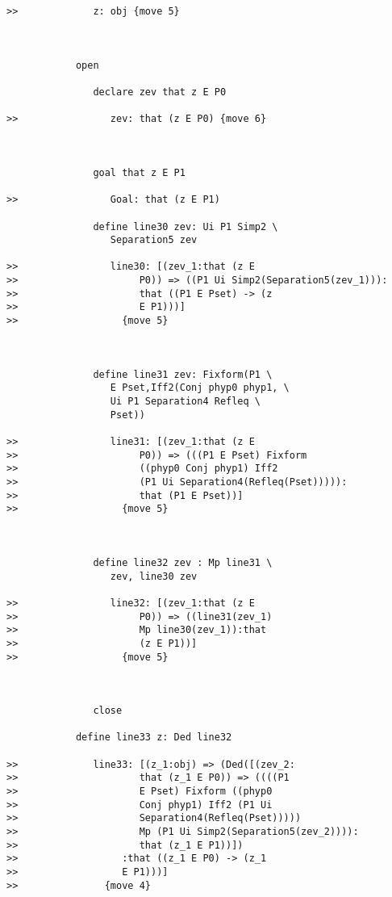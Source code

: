 \documentclass[12pt]{article}
\begin{document}
\begin{verbatim}
>>             z: obj {move 5}



            open

               declare zev that z E P0

>>                zev: that (z E P0) {move 6}



               goal that z E P1

>>                Goal: that (z E P1)

               define line30 zev: Ui P1 Simp2 \
                  Separation5 zev

>>                line30: [(zev_1:that (z E
>>                     P0)) => ((P1 Ui Simp2(Separation5(zev_1))):
>>                     that ((P1 E Pset) -> (z
>>                     E P1)))]
>>                  {move 5}



               define line31 zev: Fixform(P1 \
                  E Pset,Iff2(Conj phyp0 phyp1, \
                  Ui P1 Separation4 Refleq \
                  Pset))

>>                line31: [(zev_1:that (z E
>>                     P0)) => (((P1 E Pset) Fixform
>>                     ((phyp0 Conj phyp1) Iff2
>>                     (P1 Ui Separation4(Refleq(Pset))))):
>>                     that (P1 E Pset))]
>>                  {move 5}



               define line32 zev : Mp line31 \
                  zev, line30 zev

>>                line32: [(zev_1:that (z E
>>                     P0)) => ((line31(zev_1)
>>                     Mp line30(zev_1)):that
>>                     (z E P1))]
>>                  {move 5}



               close

            define line33 z: Ded line32

>>             line33: [(z_1:obj) => (Ded([(zev_2:
>>                     that (z_1 E P0)) => ((((P1
>>                     E Pset) Fixform ((phyp0
>>                     Conj phyp1) Iff2 (P1 Ui
>>                     Separation4(Refleq(Pset)))))
>>                     Mp (P1 Ui Simp2(Separation5(zev_2)))):
>>                     that (z_1 E P1))])
>>                  :that ((z_1 E P0) -> (z_1
>>                  E P1)))]
>>               {move 4}




\end{verbatim}
\end{document}
